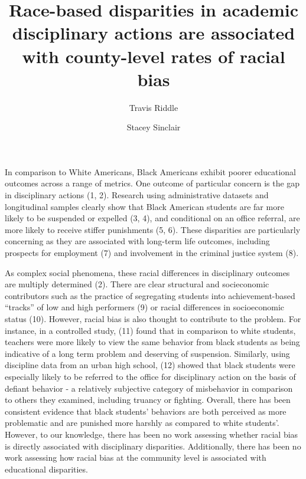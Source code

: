\documentclass[9pt,twocolumn,twoside,lineno]{pnas-new}
\title{Race-based disparities in academic disciplinary actions are associated
with county-level rates of racial bias}
\author[a]{Travis Riddle}
\author[a,b]{Stacey Sinclair}
\affil[a]{Princeton University, Department of Psychology, Princeton, NJ, 08544}
\affil[b]{African American Studies}
\begin{document}
\verticaladjustment{-2pt}

\maketitle
\thispagestyle{firststyle}



In comparison to White Americans, Black Americans exhibit poorer
educational outcomes across a range of metrics. One outcome of
particular concern is the gap in disciplinary actions (1, 2). Research
using administrative datasets and longitudinal samples clearly show that
Black American students are far more likely to be suspended or expelled
(3, 4), and conditional on an office referral, are more likely to
receive stiffer punishments (5, 6). These disparities are particularly
concerning as they are associated with long-term life outcomes,
including prospects for employment (7) and involvement in the criminal
justice system (8).

As complex social phenomena, these racial differences in disciplinary
outcomes are multiply determined (2). There are clear structural and
socieconomic contributors such as the practice of segregating students
into achievement-based ``tracks'' of low and high performers (9) or
racial differences in socioeconomic status (10). However, racial bias is
also thought to contribute to the problem. For instance, in a controlled
study, (11) found that in comparison to white students, teachers were
more likely to view the same behavior from black students as being
indicative of a long term problem and deserving of suspension.
Similarly, using discipline data from an urban high school, (12) showed
that black students were especially likely to be referred to the office
for disciplinary action on the basis of defiant behavior - a relatively
subjective category of misbehavior in comparison to others they
examined, including truancy or fighting. Overall, there has been
consistent evidence that black students' behaviors are both perceived as
more problematic and are punished more harshly as compared to white
students'. However, to our knowledge, there has been no work assessing
whether racial bias is directly associated with disciplinary
disparities. Additionally, there has been no work assessing how racial
bias at the community level is associated with educational disparities.
\end{document}
